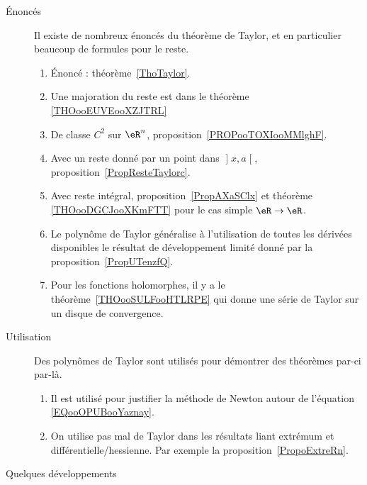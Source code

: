 \begin{description}
    \item[Énoncés] 

        Il existe de nombreux énoncés du théorème de Taylor, et en particulier beaucoup de formules pour le reste.

    \begin{enumerate}
    \item
        Énoncé : théorème~\ref{ThoTaylor}.
    \item
        Une majoration du reste est dans le théorème \ref{THOooEUVEooXZJTRL}
    \item
        De classe \( C^2\) sur \( \eR^n\), proposition~\ref{PROPooTOXIooMMlghF}.
    \item
    Avec un reste donné par un point dans \( \mathopen] x , a \mathclose[\), proposition~\ref{PropResteTaylorc}.
        \item
            Avec reste intégral, proposition~\ref{PropAXaSClx} et théorème \ref{THOooDGCJooXKmFTT} pour le cas simple \( \eR\to \eR\).
        \item
            Le polynôme de Taylor généralise à l'utilisation de toutes les dérivées disponibles le résultat de développement limité donné par la proposition~\ref{PropUTenzfQ}.
        \item
            Pour les fonctions holomorphes, il y a le théorème~\ref{THOooSULFooHTLRPE} qui donne une série de Taylor sur un disque de convergence.
        \end{enumerate}

    \item[Utilisation]

        Des polynômes de Taylor sont utilisés pour démontrer des théorèmes par-ci par-là.

\begin{enumerate}
        \item
            Il est utilisé pour justifier la méthode de Newton autour de l'équation \eqref{EQooOPUBooYaznay}.
    \item
        On utilise pas mal de Taylor dans les résultats liant extrémum et différentielle/hessienne. Par exemple la proposition~\ref{PropoExtreRn}.
\end{enumerate}

\item[Quelques développements]


\end{description}
